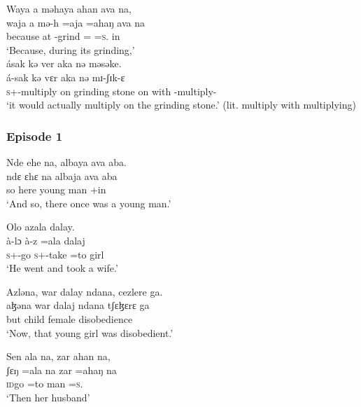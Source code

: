 \ea    Waya  a  məhaya  ahan  ava  na,\\
\gll waja   a  mə-h    =aja       =ahaŋ      ava    na\\
because  at   {\NOM}{}-grind  ={\PLU}   =\textsc{s}.{\POSS}   in   {\PSP}\\
\glt ‘Because, during its grinding,’\\

\clearpage
\medskip
 ásak  kə  ver  aka  nə  məsəke.\\
\gll á{}-sak                    kə   vɛr               aka   nə   mɪ-ʃɪk-ɛ\\
 \textsc{s}+{\IFV}-multiply   on     {grinding stone}     on    with   {\NOM}{}-multiply-{\CL}\\
\glt ‘it would actually multiply on the grinding stone.' (lit. multiply with multiplying)
\z

\subsubsection*{Episode 1}
\ea    Nde  ehe  na,    albaya  ava  aba.        \\
\gll ndɛ    ɛhɛ  na   albaja       ava  aba \\
so       here    {\PSP}  {young man}  {\EXT}{}+in   {\EXT}\\
\glt ‘And so, there once was a young  man.’\\
\z

\ea    Olo  azala  dalay.\\
\gll à-lɔ            à-z    =ala  dalaj\\ 
\textsc{s}+{\PFV}-go    \textsc{s}+{\PFV}-take  =to  girl\\
 \glt ‘He went and took a wife.’
\z

\ea   Azləna, war  dalay  ndana,  cezlere  ga.\\
\gll aɮəna  war   dalaj   ndana tʃɛɮɛrɛ          ga\\
but  child      female    {\DEM}  disobedience {\ADJ}\\
\glt ‘Now, that young girl was disobedient.’\\
\z

\ea   Sen  ala  na,  zar  ahan  na,\\
\gll ʃɛŋ     =ala   na  zar  =ahaŋ    na\\
\textsc{id}go   =to          {\PSP}  man    =\textsc{s}.{\POSS}    {\PSP}\\
\glt ‘Then her husband’\\

